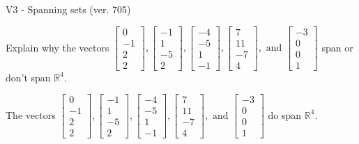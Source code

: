 \begin{exercise}
  \begin{exerciseTitle}V3 - Spanning sets (ver. 705)\end{exerciseTitle}
  \begin{exerciseStatement}
    Explain why the vectors \(\left[\begin{array}{r}
0 \\
-1 \\
2 \\
2
\end{array}\right] , \left[\begin{array}{r}
-1 \\
1 \\
-5 \\
2
\end{array}\right] , \left[\begin{array}{r}
-4 \\
-5 \\
1 \\
-1
\end{array}\right] , \left[\begin{array}{r}
7 \\
11 \\
-7 \\
4
\end{array}\right] , \text{ and } \left[\begin{array}{r}
-3 \\
0 \\
0 \\
1
\end{array}\right]\) span or don't span \(\mathbb{R}^4\). 
	


  \end{exerciseStatement}
  \begin{exerciseAnswer}
   The vectors \(\left[\begin{array}{r}
0 \\
-1 \\
2 \\
2
\end{array}\right] , \left[\begin{array}{r}
-1 \\
1 \\
-5 \\
2
\end{array}\right] , \left[\begin{array}{r}
-4 \\
-5 \\
1 \\
-1
\end{array}\right] , \left[\begin{array}{r}
7 \\
11 \\
-7 \\
4
\end{array}\right] , \text{ and } \left[\begin{array}{r}
-3 \\
0 \\
0 \\
1
\end{array}\right]\) 
  	 do  
	span \(\mathbb{R}^4\).
  



\end{exerciseAnswer}
\end{exercise}

